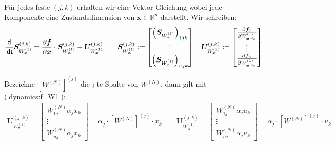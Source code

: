 \documentclass[a4paper, 12pt]{scrartcl}
\newcommand{\gruen}[2][cadGreen]{\textcolor{#1}{#2}}
\newcommand{\dt}{\thinspace \mathsf{dt}}
\begin{document}
Für jedes feste $(j,k)$ erhalten wir eine Vektor Gleichung 
wobei jede Komponente eine Zustandsdimension von $\bm{x} \in \mathbb{R}^n$ darstellt. 
Wir schreiben:
\begin{align*}
    \frac{\mathsf{d}}{\dt}
    \bm{S}_{W_{\bm{x}}^{(1)}}^{(j,k)}
    =
    \frac{\partial \bm{f}}{\partial \bm{x}}
    \cdot
    \bm{S}_{W_{\bm{x}}^{(1)}}^{(j,k)}
    +
    \bm{U}_{W_{\bm{x}}^{(1)}}^{(j,k)}
    \qquad
    \bm{S}_{W_{\bm{x}}^{(1)}}^{(j,k)}:=
    \begin{bmatrix}
        \left(\bm{S}_{W_{\bm{x}}^{(1)}}\right)_{\gruen{1}jk} \\
        \vdots \\
        \left(\bm{S}_{W_{\bm{x}}^{(1)}}\right)_{\gruen{n}jk}
    \end{bmatrix}
    \quad
    \bm{U}_{W_{\bm{x}}^{(1)}}^{(j,k)}
    :=
    \begin{bmatrix}
        \frac{\partial \bm{f}_{\gruen{1}}}{\partial W^{(1)}_{\bm{x},jk}} \\
        \vdots \\
        \frac{\partial \bm{f}_{\gruen{n}}}{\partial W^{(1)}_{\bm{x},jk}}
    \end{bmatrix}
\end{align*}

Bezeichne $\left[W^{(N)}\right]^{(j)}$ die j-te Spalte von $W^{(N)}$, 
dann gilt mit (\ref{dynamics:f_W1}):
%
\begin{align*}
    \bm{U}_{W_{\bm{x}}^{(1)}}^{(j,k)} 
    =
    \begin{bmatrix}
        W_{1j}^{(N)} \alpha_j 
        x_k
        \\
        \vdots \\
        W_{nj}^{(N)} \alpha_j 
        x_k
    \end{bmatrix} 
    =
    \alpha_j 
    \cdot
    \left[W^{(N)}\right]^{(j)}
    \cdot 
    x_k
    \qquad
    \bm{U}_{W_{\bm{u}}^{(1)}}^{(j,k)} 
    =
    \begin{bmatrix}
        W_{1j}^{(N)} \alpha_j
        u_k
        \\
        \vdots \\
        W_{nj}^{(N)} \alpha_j
        u_k
    \end{bmatrix} 
    =
    \alpha_j
    \cdot
    \left[W^{(N)}\right]^{(j)}
    \cdot 
    u_k
\end{align*}
\end{document}
